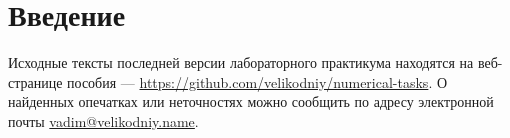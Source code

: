 \chapter*{Введение}

\lipsum[1-7]

Исходные тексты последней версии лабораторного практикума находятся на
веб-странице пособия —
\url{https://github.com/velikodniy/numerical-tasks}. О найденных
опечатках или неточностях можно сообщить по адресу электронной почты
\href{mailto:vadim@veikodniy.name}{vadim@velikodniy.name}.
